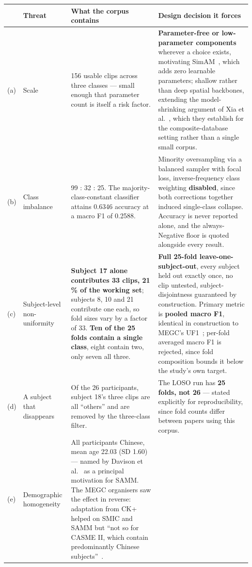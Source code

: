 \begin{table}[htbp]
	\centering
	\scriptsize
	\begin{tabular}{@{}p{0.3cm} p{2.0cm} p{5.3cm} p{5.6cm}@{}}
		\hline
		& \textbf{Threat} & \textbf{What the corpus contains} & \textbf{Design decision it forces} \\
		\hline
		(a) & Scale
		& 156 usable clips across three classes --- small enough that parameter count is itself a risk factor.
		& \textbf{Parameter-free or low-parameter components} wherever a choice exists, motivating SimAM~\cite{yang2021}, which adds zero learnable parameters; shallow rather than deep spatial backbones, extending the model-shrinking argument of Xia et al.~\cite{xia2020b}, which they establish for the composite-database setting rather than a single small corpus. \\
		(b) & Class imbalance
		& 99 : 32 : 25. The majority-class-constant classifier attains 0.6346 accuracy at a macro F1 of 0.2588.
		& Minority oversampling via a balanced sampler with focal loss, inverse-frequency class weighting \textbf{disabled}, since both corrections together induced single-class collapse. Accuracy is never reported alone, and the always-Negative floor is quoted alongside every result. \\
		(c) & Subject-level non-uniformity
		& \textbf{Subject 17 alone contributes 33 clips, 21\,\% of the working set}; subjects 8, 10 and 21 contribute one each, so fold sizes vary by a factor of 33. \textbf{Ten of the 25 folds contain a single class}, eight contain two, only seven all three.
		& \textbf{Full 25-fold leave-one-subject-out}, every subject held out exactly once, no clip untested, subject-disjointness guaranteed by construction. Primary metric is \textbf{pooled macro F1}, identical in construction to MEGC's UF1~\cite{see2019}; per-fold averaged macro F1 is rejected, since fold composition bounds it below the study's own target. \\
		(d) & A subject that disappears
		& Of the 26 participants, subject 18's three clips are all ``others'' and are removed by the three-class filter.
		& The LOSO run has \textbf{25 folds, not 26} --- stated explicitly for reproducibility, since fold counts differ between papers using this corpus. \\
		(e) & Demographic homogeneity
		& All participants Chinese, mean age 22.03 (SD 1.60) --- named by Davison et al.~\cite{davison2018} as a principal motivation for SAMM. The MEGC organisers saw the effect in reverse: adaptation from CK+ helped on SMIC and SAMM but ``not so for CASME II, which contain predominantly Chinese subjects''~\cite{see2019}.

\end{tabular}
\end{table}
